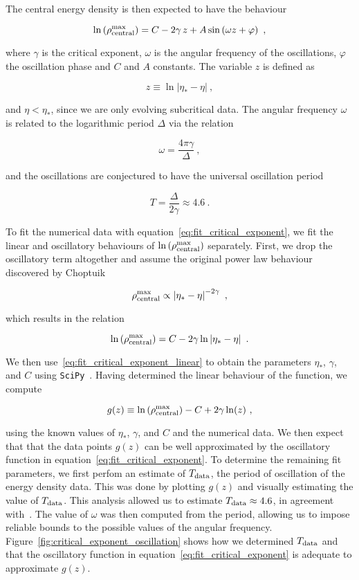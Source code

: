 \documentclass[a4paper,11pt]{article}
\newcommand{\g}{\gamma}
\newcommand{\D}{\Delta}
\newcommand{\lrpar}[1]{\left( #1 \right)}
\newcommand{\abs}[1]{\left| #1 \right|}
\newcommand{\n}{\noindent}
\newcommand{\eq}[1]{
  \begin{equation}
    #1
  \end{equation}
}
\begin{document}
The central energy density is then expected to have the behaviour

\eq{
\ln\lrpar{\rho^{\rm max}_{\rm central}} = C - 2\g\,z + A\sin\lrpar{\omega z + \varphi}\ ,\label{eq:fit_critical_exponent}
}

\n where $\g$ is the critical exponent, $\omega$ is the angular frequency of the oscillations, $\varphi$ the oscillation phase and $C$ and $A$ constants. The variable $z$ is defined as

\eq{
  z \equiv \ln\abs{\eta_{*}-\eta}\ ,
}

\n and $\eta<\eta_{*}$, since we are only evolving subcritical data. The angular frequency $\omega$ is related to the logarithmic period $\D$ via the relation

\eq{
  \omega = \frac{4\pi\g}{\D}\ ,\label{eq:universal_period_ito_omega}
}

\n and the oscillations are conjectured to have the universal oscillation period~\cite{PhysRevD.55.R440}

\eq{
  T = \frac{\D}{2\g} \approx 4.6\ .
}

To fit the numerical data with equation~\eqref{eq:fit_critical_exponent}, we fit the linear and oscillatory behaviours of $\ln\lrpar{\rho^{\rm max}_{\rm central}}$ separately. First, we drop the oscillatory term altogether and assume the original power law behaviour discovered by Choptuik

\eq{
  \rho^{\rm max}_{\rm central} \propto \abs{\eta_{*}-\eta}^{-2\g}\ ,
}

\n which results in the relation


\eq{
  \ln\lrpar{\rho^{\rm max}_{\rm central}} = C - 2\g\ln\abs{\eta_{*}-\eta}\ .\label{eq:fit_critical_exponent_linear}
}

\n We then use~\eqref{eq:fit_critical_exponent_linear} to obtain the parameters $\eta_{*}$, $\g$, and $C$ using {\tt SciPy}~\cite{2020SciPy-NMeth}. Having determined the linear behaviour of the function, we compute

\eq{
g(z) \equiv \ln\lrpar{\rho^{\rm max}_{\rm central}} - C + 2\g\ln(z)\ ,
}

\n using the known values of $\eta_{*}$, $\g$, and $C$ and the numerical data. We then expect that that the data points $g(z)$ can be well approximated by the oscillatory function in equation~\eqref{eq:fit_critical_exponent}. To determine the remaining fit parameters, we first perfom an estimate of $T_{\rm data}$, the period of oscillation of the energy density data. This was done by plotting $g(z)$ and visually estimating the value of $T_{\rm data}$. This analysis allowed us to estimate $T_{\rm data}\approx4.6$, in agreement with~\cite{PhysRevD.55.R440}. The value of $\omega$ was then computed from the period, allowing us to impose reliable bounds to the possible values of the angular frequency. Figure~\ref{fig:critical_exponent_oscillation} shows how we determined $T_{\rm data}$ and that the oscillatory function in equation~\eqref{eq:fit_critical_exponent} is adequate to approximate $g(z)$.
\end{document}
